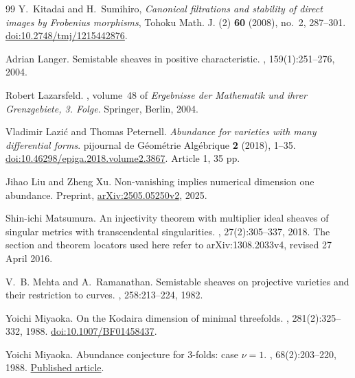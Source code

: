 \begin{thebibliography}{99}
Y.~Kitadai and H.~Sumihiro,
\emph{Canonical filtrations and stability of direct images by Frobenius morphisms},
Tohoku Math. J. (2) \textbf{60} (2008), no.~2, 287--301.
\href{https://doi.org/10.2748/tmj/1215442876}{doi:10.2748/tmj/1215442876}.

Adrian Langer.
\newblock Semistable sheaves in positive characteristic.
, 159(1):251--276, 2004.

Robert Lazarsfeld.
, volume~48 of {\em Ergebnisse der Mathematik und ihrer Grenzgebiete, 3. Folge}.
\newblock Springer, Berlin, 2004.

Vladimir Lazi{\'c} and Thomas Peternell.
\newblock \emph{Abundance for varieties with many differential forms}.
pijournal de G{\'e}om{\'e}trie Alg{\'e}brique \textbf{2} (2018), 1--35.
\newblock \href{https://doi.org/10.46298/epiga.2018.volume2.3867}{doi:10.46298/epiga.2018.volume2.3867}.
\newblock Article 1, 35 pp.

Jihao Liu and Zheng Xu.
\newblock Non-vanishing implies numerical dimension one abundance.
\newblock Preprint, \href{https://arxiv.org/abs/2505.05250v2}{arXiv:2505.05250v2}, 2025.

Shin-ichi Matsumura.
\newblock An injectivity theorem with multiplier ideal sheaves of singular metrics with transcendental singularities.
, 27(2):305--337, 2018.
\newblock The section and theorem locators used here refer to arXiv:1308.2033v4, revised 27 April 2016.

V.~B. Mehta and A.~Ramanathan.
\newblock Semistable sheaves on projective varieties and their restriction to curves.
, 258:213--224, 1982.

Yoichi Miyaoka.
\newblock On the Kodaira dimension of minimal threefolds.
, 281(2):325--332, 1988.
\newblock \href{https://doi.org/10.1007/BF01458437}{doi:10.1007/BF01458437}.

Yoichi Miyaoka.
\newblock Abundance conjecture for 3-folds: case $\nu=1$.
, 68(2):203--220, 1988.
\newblock \href{https://www.numdam.org/item/CM_1988__68_2_203_0/}{Published article}.


\end{thebibliography}

